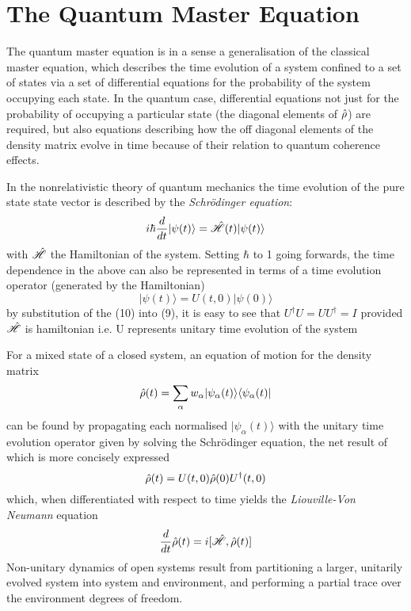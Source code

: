 
\section{The Quantum Master Equation}
The quantum master equation is in a sense a generalisation of the classical master equation, which describes the time evolution of a system confined to a set of states via a set of differential equations for the probability of the system occupying each state. In the quantum case, differential equations not just for the probability of occupying a particular state (the diagonal elements of $\hat{\rho}$) are required, but also equations describing how the off diagonal elements of the density matrix evolve in time because of their relation to quantum coherence effects.

In the nonrelativistic theory of quantum mechanics the time evolution of the pure state state vector is described by the \emph{Schr\"odinger equation}:
\begin{equation}
	i\hbar \frac{d}{dt} |\psi(t)\rangle = \hat{\mathscr{H}}(t) |\psi(t) \rangle
\end{equation}
with $\hat{\mathscr{H}}$ the Hamiltonian of the system. Setting $\hbar$ to 1 going forwards, the time dependence in the above can also be represented in terms of a time evolution operator (generated by the Hamiltonian) 
\begin{equation}
	|\psi(t) \rangle = U(t, 0) | \psi(0) \rangle
\end{equation}
by substitution of the (10) into (9), it is easy to see that $U^{\dagger}U = UU^\dagger = I$ provided $\hat{\mathscr{H}}$ is hamiltonian i.e. U represents unitary time evolution of the system

For a mixed state of a closed system, an equation of motion for the density matrix
\begin{equation}
	\hat{\rho} (t) = \sum_\alpha w_{\alpha} |\psi_\alpha (t) \rangle \langle \psi_\alpha (t) |
\end{equation}
can be found by propagating each normalised $| \psi_\alpha (t) \rangle$ with the unitary time evolution operator given by solving the Schr\"odinger equation, the net result of which is more concisely expressed
\begin{equation}
	\hat{\rho} (t) = U(t, 0)\hat{\rho} (0) U^\dagger (t, 0)
\end{equation}
which, when differentiated with respect to time yields the \emph{Liouville-Von Neumann} equation
\begin{equation}
	\frac{d}{dt}\hat{\rho}(t) = i [\hat{\mathscr{H}}, \hat{\rho} (t) ]
\end{equation}
Non-unitary dynamics of open systems result from partitioning a larger, unitarily evolved system into system and environment, and performing a partial trace over the environment degrees of freedom.

